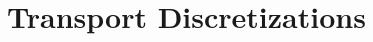 \documentclass[../doc.tex]{subfiles}
\begin{document}
\chapter{Transport Discretizations}
\end{document}
